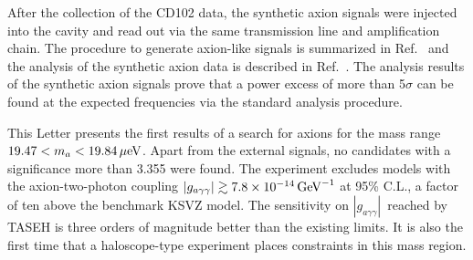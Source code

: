\documentclass[%
 reprint,prl, %
 amsmath,amssymb,
 aps,
]{revtex4-2}
\newcommand{\gagg}{\ensuremath{\left|g_{a\gamma\gamma}\right|}}
\newcommand{\ma}{\ensuremath{m_a}}
\newcommand{\muevcc}{\ensuremath{\,\mu\text{e\hspace{-.08em}V}}}
\newcommand{\GeVinv}{\ensuremath{\,\text{Ge\hspace{-.08em}V}^{-1}}}
\newcommand{\mlo}{\ensuremath{19.47}}
\newcommand{\mhi}{\ensuremath{19.84}}
\newcommand{\avelimit}{\ensuremath{7.8\times 10^{-14}}}
\begin{document}
After the collection of the CD102 data, 
the synthetic axion signals were injected into the cavity and read out via the 
same transmission line and amplification chain. 
The procedure to generate axion-like signals is summarized in 
Ref.~\cite{TASEHInstrumentation} and the analysis of the synthetic axion 
data is described in Ref.~\cite{TASEHAnalysis}. 
The analysis results of the synthetic axion signals prove that a power 
excess of more than 5$\sigma$ can be found at the expected frequencies via 
the standard analysis procedure.  

This Letter presents the first results of a search for axions for the mass 
range $\mlo < \ma < \mhi \muevcc$. 
Apart from the external signals, no candidates with a significance more than
3.355 were found. The experiment excludes models with the 
axion-two-photon coupling $\gagg\gtrsim \avelimit\GeVinv$ at 95\% C.L.,
 a factor of ten 
above the benchmark KSVZ model. The sensitivity on \gagg\ reached by TASEH 
is three orders of magnitude better than the existing limits. 
It is also the first time that a haloscope-type experiment places 
constraints in this mass region. 


\begin{acknowledgments}

\end{acknowledgments}

\end{document}
